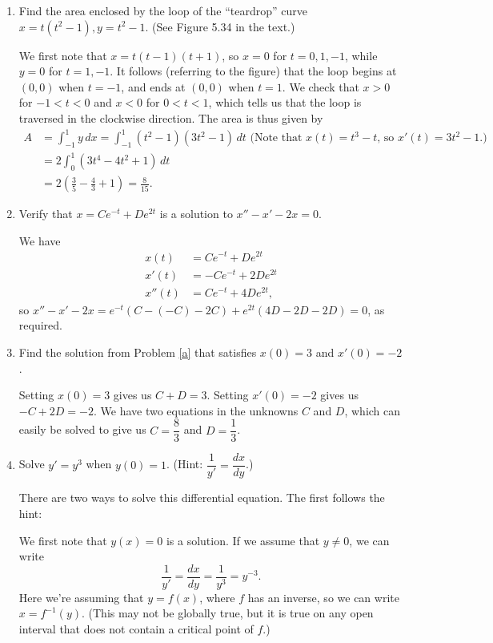 \documentclass[12pt]{article}
\begin{document}
\begin{enumerate}
 \item Find the area enclosed by the loop of the ``teardrop'' curve $x=t(t^2-1), y=t^2-1$. (See Figure 5.34 in the text.)

\bigskip

We first note that $x = t(t-1)(t+1)$, so $x=0$ for $t=0,1,-1$, while $y=0$ for $t=1, -1$. It follows (referring to the figure) that the loop begins at $(0,0)$ when $t=-1$, and ends at $(0,0)$ when $t=1$. We check that $x>0$ for $-1<t<0$ and $x<0$ for $0<t<1$, which tells us that the loop is traversed in the clockwise direction. The area is thus given by
\begin{align*}
 A & = \int_{-1}^1 y\,dx = \int_{-1}^1 (t^2-1)(3t^2-1)\,dt \text{ (Note that $x(t)=t^3-t$, so $x'(t) = 3t^2-1$.)}\\
& = 2\int_0^1 (3t^4-4t^2+1)\,dt\\
& = 2\left(\frac{3}{5}-\frac{4}{3}+1\right) = \frac{8}{15}.
\end{align*}

 \item Verify that $x=Ce^{-t}+De^{2t}$ is a solution to $x''-x'-2x=0$.\label{a}

\bigskip

We have
\begin{align*}
 x(t) & = Ce^{-t}+De^{2t}\\
 x'(t) & = -Ce^{-t}+2De^{2t}\\
 x''(t) & = Ce^{-t}+4De^{2t},
\end{align*}
so $x''-x'-2x = e^{-t}(C-(-C)-2C)+e^{2t}(4D-2D-2D) = 0$, as required.

 \item Find the solution from Problem \ref{a} that satisfies $x(0)=3$ and $x'(0)=-2$.

\bigskip

Setting $x(0)=3$ gives us $C+D=3$. Setting $x'(0)=-2$ gives us $-C+2D=-2$. We have two equations in the unknowns $C$ and $D$, which can easily be solved to give us $C=\dfrac{8}{3}$ and $D=\dfrac{1}{3}$.

 \item Solve $y'=y^3$ when $y(0)=1$. (Hint: $\dfrac{1}{y'} = \dfrac{dx}{dy}$.)

\bigskip

There are two ways to solve this differential equation. The first follows the hint: 

We first note that $y(x)=0$ is a solution. If we assume that $y\neq 0$, we can write
\[
 \frac{1}{y'} = \frac{dx}{dy} = \frac{1}{y^3} = y^{-3}.
\]
Here we're assuming that $y=f(x)$, where $f$ has an inverse, so we can write $x=f^{-1}(y)$. (This may not be globally true, but it is true on any open interval that does not contain a critical point of $f$.)


\end{enumerate}
\end{document}
